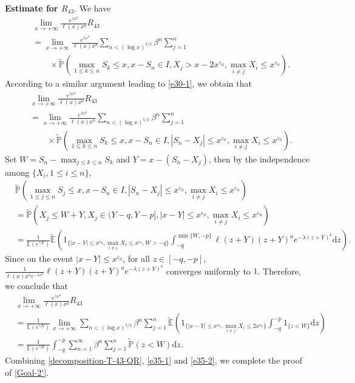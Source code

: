 \documentclass[11pt]{article}
\numberwithin{equation}{section}
\begin{document}
\noindent
{\bf Estimate for $R_{43}$}. We have 
\begin{align}\label{e36-2}
	& \lim_{x\to+\infty} \frac{e^{\lambda x^b}}{\ell(x)x^a } R_{43} \nonumber\\
	& = \lim_{x\to+\infty} \frac{e^{\lambda x^b}}{\ell(x)x^a }  \sum_{n<(\log x)^{5/2}}  \beta^{n} \sum_{j=1}^n \nonumber\\
	&\qquad \times \widetilde{\mathbb{P}}\left(\max_{1\leq k \leq n} S_k\leq x, x-S_n\in I,   X_j>x-2x^{\varepsilon_0},\max_{i\neq j} X_i \leq x^{\varepsilon_0} \right). 
\end{align}
According to a similar argument leading to \eqref{e30-1}, we obtain that 
\begin{align}
	&  \lim_{x\to+\infty} \frac{e^{\lambda x^b}}{\ell(x)x^a } R_{43} \nonumber\\
	& =\lim_{x\to+\infty}  \frac{e^{\lambda x^b}}{\ell(x)x^a }  \sum_{n<(\log x)^{5/2}}  \beta^{n} \sum_{j=1}^n \nonumber\\
	&\qquad \times \widetilde{\mathbb{P}}\left(\max_{1\leq k \leq n} S_k \leq x, x-S_n\in I,     |S_n-X_j| \leq x^{\varepsilon_0} ,  \max_{i\neq j} X_i\leq x^{\varepsilon_0} \right). 
\end{align}
Set $W=S_n-\max_{j\leq k\leq n}S_k$ and $Y=x- (S_n-X_j)$, then by the independence among $\{X_i, 1\leq i\leq n\}$,
\begin{align}
	& \widetilde{\mathbb{P}}\left(\max_{1\leq j \leq n} S_j \leq x, x-S_n\in I,     |S_n-X_j| \leq x^{\varepsilon_0} ,  \max_{i\neq j} X_i\leq x^{\varepsilon_0} \right)\nonumber\\
	&= \widetilde{\mathbb{P}}\left(X_j \leq W+Y, X_j\in (Y-q, Y-p],    |x-Y| \leq x^{\varepsilon_0} ,  \max_{i\neq j} X_i\leq x^{\varepsilon_0} \right)\nonumber\\
	&=\frac{1}{\mathbb{E}(e^{\gamma X})} \widetilde{\mathbb{E}}\left(1_{\{|x-Y| \leq  x^{\varepsilon_0} ,  \max_{i\neq j} X_i\leq x^{\varepsilon_0}, W>-q \}}  \int_{ -q }^{\min\{W, -p\}} \ell(z+Y)(z+Y)^a e^{-\lambda (z+Y)^b}\mathrm{d}z \right).
\end{align}
Since on the event $|x-Y|\leq x^{\varepsilon_0}$, for all $z\in [-q, -p]$, 
$\frac{1}{\ell(x)x^a e^{-\lambda x^b}}\ell(z+Y)(z+Y)^a e^{-\lambda (z+Y)^b}$ converges uniformly to $1$. Therefore, we conclude that 
\begin{align}\label{e35-2}
	&  \lim_{x\to+\infty} \frac{e^{\lambda x^b}}{\ell(x)x^a } R_{43} \nonumber\\
	& =\frac{1}{\mathbb{E}(e^{\gamma X})} \lim_{x\to+\infty} \sum_{n<(\log x)^{5/2}}  \beta^{n} \sum_{j=1}^n\widetilde{\mathbb{E}}\left(1_{\{ |x-Y| \leq  x^{\varepsilon_0} ,  \max_{i\neq j} X_i\leq 2x^{\varepsilon_0}\}}  \int_{ -q }^{-p} 1_{\{z<W\}}\mathrm{d}z \right)\nonumber\\
	& = \frac{1}{\mathbb{E}(e^{\gamma X})}    \int_{ -q }^{-p}\sum_{n=1}^\infty  \beta^{n} \sum_{j=1}^n\widetilde{\mathbb{P}}\left(   z<W\right) \mathrm{d}z .
\end{align}
Combining \eqref{decomposition-T-43-QR}, \eqref{e35-1} and \eqref{e35-2}, we complete the proof of \eqref{Goal-2'}. 
\end{document}
